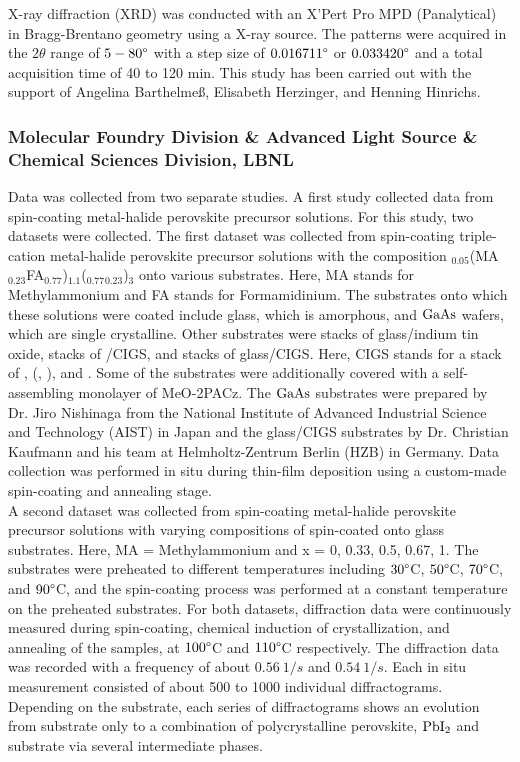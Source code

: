 X-ray diffraction (XRD) was conducted with an X’Pert Pro MPD (Panalytical) in Bragg-Brentano geometry using a  X-ray source. The patterns were acquired in the $2\theta$ range of $5-80\degree$ with a step size of $0.016711\degree$ or $0.033420\degree$ and a total acquisition time of 40 to 120 min. This study has been carried out with the support of Angelina Barthelmeß, Elisabeth Herzinger, and Henning Hinrichs. \\

\subsubsection*{Molecular Foundry Division \& Advanced Light Source \& Chemical Sciences Division, LBNL}

Data was collected from two separate studies. A first study collected data from spin-coating metal-halide perovskite precursor solutions. For this study, two datasets were collected. The first dataset was collected from spin-coating triple-cation metal-halide perovskite precursor solutions with the composition $_{0.05}$(MA$_{0.23}$FA$_{0.77}$)$_{1.1}$($_{0.77}$$_{0.23}$)$_{3}$ onto various substrates. Here, MA stands for Methylammonium and FA stands for Formamidinium. The substrates onto which these solutions were coated include glass, which is amorphous, and $\ce{GaAs}$ wafers, which are single crystalline. Other substrates were stacks of glass/indium tin oxide, stacks of /CIGS, and stacks of glass/CIGS. Here, CIGS stands for a stack of , (, ), and . Some of the substrates were additionally covered with a self-assembling monolayer of MeO-2PACz. The $\ce{GaAs}$ substrates were prepared by Dr. Jiro Nishinaga from the National Institute of Advanced Industrial Science and Technology (AIST) in Japan and the glass/CIGS substrates by Dr. Christian Kaufmann and his team at Helmholtz-Zentrum Berlin (HZB) in Germany. Data collection was performed in situ during thin-film deposition using a custom-made spin-coating and annealing stage. \\

A second dataset was collected from spin-coating metal-halide perovskite precursor solutions with varying compositions of  spin-coated onto glass substrates. Here, MA = Methylammonium and x = 0, 0.33, 0.5, 0.67, 1. The substrates were preheated to different temperatures including $30\degree $C, $50\degree $C, $70\degree $C, and $90\degree $C, and the spin-coating process was performed at a constant temperature on the preheated substrates. For both datasets, diffraction data were continuously measured during spin-coating, chemical induction of crystallization, and annealing of the samples, at $100\degree$C and $110\degree$C respectively. The diffraction data was recorded with a frequency of about $0.56 
 \ 1/\si{s}$ and $0.54 \ 1/\si{s}$. Each in situ measurement consisted of about 500 to 1000 individual diffractograms. Depending on the substrate, each series of diffractograms shows an evolution from substrate only to a combination of polycrystalline perovskite, $\ce{PbI2}$ and substrate via several intermediate phases. \\

